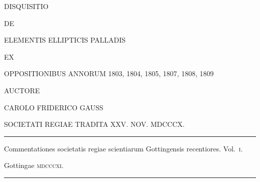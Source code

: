 \thispagestyle{empty}
\begin{center}\vspace*{.45in}
{\Large DISQUISITIO}\par\medskip
DE\par\medskip
{\LARGE ELEMENTIS ELLIPTICIS PALLADIS}\par\medskip
EX\par\medskip
OPPOSITIONIBUS ANNORUM 1803, 1804, 1805, 1807, 1808, 1809\par\bigskip
AUCTORE\par\bigskip
{\large CAROLO FRIDERICO GAUSS}\par\bigskip
SOCIETATI REGIAE TRADITA XXV. NOV. MDCCCX.\par\vfill
\rule{.75\linewidth}{.3pt}\par\smallskip
Commentationes societatis regiae scientiarum Gottingensis recentiores. Vol.~\textsc{i}.\par
Gottingae \textsc{mdcccxi}.\par\smallskip
\rule{.75\linewidth}{.3pt}
\end{center}\clearpage
